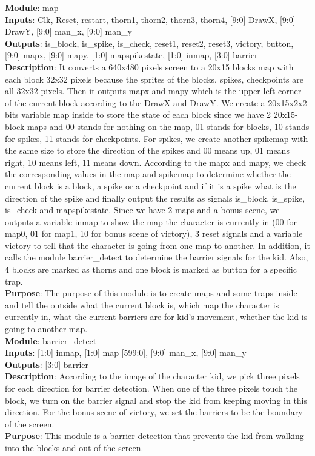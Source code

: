 \documentclass[12pt]{article}
\begin{document}
\textbf{Module}: map \\ 
\textbf{Inputs}: Clk, Reset, restart, thorn1, thorn2, thorn3, thorn4, [9:0] DrawX, [9:0] DrawY, [9:0] man\_x, [9:0] man\_y \\ 
\textbf{Outputs}: is\_block, is\_spike, is\_check, reset1, reset2, reset3, victory, button, [9:0] mapx, [9:0] mapy, [1:0] mapspikestate, [1:0] inmap, [3:0] barrier \\
\textbf{Description}: It converts a 640x480 pixels screen to a 20x15 blocks map with each block 32x32 pixels because the sprites of the blocks, spikes, checkpoints are all 32x32 pixels. Then it outputs mapx and mapy which is the upper left corner of the current block according to the DrawX and DrawY. We create a 20x15x2x2 bits variable map inside to store the state of each block since we have 2 20x15-block maps and 00 stands for nothing on the map, 01 stands for blocks, 10 stands for spikes, 11 stands for checkpoints. For spikes, we create another spikemap with the same size to store the direction of the spikes and 00 means up, 01 means right, 10 means left, 11 means down. According to the mapx and mapy, we check the corresponding values in the map and spikemap to determine whether the current block is a block, a spike or a checkpoint and if it is a spike what is the direction of the spike and finally output the results as signals is\_block, is\_spike, is\_check and mapspikestate. Since we have 2 maps and a bonus scene, we outputs a variable inmap to show the map the character is currently in (00 for map0, 01 for map1, 10 for bonus scene of victory), 3 reset signals and a variable victory to tell that the character is going from one map to another. In addition, it calls the module barrier\_detect to determine the barrier signals for the kid. Also, 4 blocks are marked as thorns and one block is marked as button for a specific trap. \\ 
\textbf{Purpose}: The purpose of this module is to create maps and some traps inside and tell the outside what the current block is, which map the character is currently in, what the current barriers are for kid's movement, whether the kid is going to another map. \\

\textbf{Module}: barrier\_detect \\ 
\textbf{Inputs}: [1:0] inmap, [1:0] map [599:0], [9:0] man\_x, [9:0] man\_y \\ 
\textbf{Outputs}: [3:0] barrier \\
\textbf{Description}: According to the image of the character kid, we pick three pixels for each direction for barrier detection. When one of the three pixels touch the block, we turn on the barrier signal and stop the kid from keeping moving in this direction. For the bonus scene of victory, we set the barriers to be the boundary of the screen. \\ 
\textbf{Purpose}: This module is a barrier detection that prevents the kid from walking into the blocks and out of the screen. \\
\end{document}
